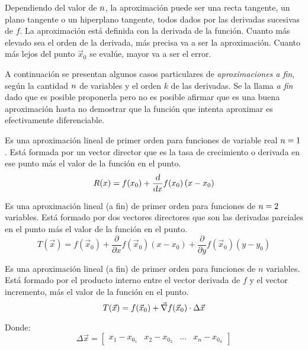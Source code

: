 \documentclass[a5paper,12pt,twoside]{book}
\begin{document}
Dependiendo del valor de $n$, la aproximación puede ser una recta tangente, un plano tangente o un hiperplano tangente, todos dados por las derivadas sucesivas de $f$. La aproximación está definida con la derivada de la función. Cuanto más elevado sea el orden de la derivada, más precisa va a ser la aproximación. Cuanto más lejos del punto $\Vec{x}_0$ se evalúe, mayor va a ser el error.

A continuación se presentan algunos casos particulares de \emph{aproximaciones a fin}, según la cantidad $n$ de variables y el orden $k$ de las derivadas. Se la llama \emph{a fin} dado que es posible proponerla pero no es posible afirmar que es una buena aproximación hasta no demostrar que la función que intenta aproximar es efectivamente diferenciable.


Es una aproximación lineal de primer orden para funciones de variable real $n=1$. Está formada por un vector director que es la tasa de crecimiento o derivada en ese punto más el valor de la función en el punto.
\begin{equation*}
    R(x) = f(x_0) + \frac{\textsl{d}}{\textsl{d} x} f(x_0) \left( x-x_0 \right)
\end{equation*}


Es una aproximación lineal (a fin) de primer orden para funciones de $n=2$ variables. Está formado por dos vectores directores que son las derivadas parciales en el punto más el valor de la función en el punto.
\begin{equation*}
    T(\Vec{x}) = f(\Vec{x}_0) + \frac{\partial}{\partial x} f(\Vec{x}_0) \left(x-x_0\right) + \frac{\partial}{\partial y} f(\Vec{x}_0) \left(y-y_0\right)
\end{equation*}


Es una aproximación lineal (a fin) de primer orden para funciones de $n$ variables. Está formado por el producto interno entre el vector derivada de $f$ y el vector incremento, más el valor de la función en el punto.
\begin{equation*}
    T(\Vec{x}) = f(\Vec{x}_0) + \Vec{\nabla} f(\Vec{x}_0) \cdot \Delta \Vec{x}
\end{equation*}

Donde:
\begin{equation*}
    \Delta \Vec{x} = \begin{bmatrix} x_1-x_{0_1} & x_2-x_{0_2} & \dots & x_n-x_{0_n} \end{bmatrix}
\end{equation*}
\end{document}
